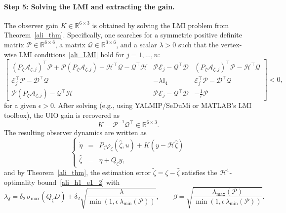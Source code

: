 \paragraph{Step 5: Solving the LMI and extracting the gain.}
The observer gain $K\in\mathbb{R}^{6\times 3}$ is obtained by solving the LMI problem from Theorem~\ref{ali_thm}. Specifically, one searches for a symmetric positive definite matrix $\mathcal{P}\in\mathbb{R}^{6\times 6}$, a matrix $\mathcal{Q}\in\mathbb{R}^{3\times 6}$, and a scalar $\lambda>0$ such that the vertex-wise LMI conditions~\eqref{ali_LMI} hold for $j=1,\dots,\bar{n}$:
\begin{equation}\label{eq:vehicle_LMI_recap}
\begin{bmatrix}
\left( P_{\zeta} \mathcal{A}_{\zeta,j}\right)^{\top} \mathcal{P} + \mathcal{P} \left( P_{\zeta} \mathcal{A}_{\zeta,j} \right)  - \mathcal{H}^{\top} \mathcal{Q}  - \mathcal{Q}^{\top}  \mathcal{H}
&
\mathcal{P} \mathcal{E}_{j} - \mathcal{Q}^{\top}  \mathcal{D}  & \left( P_{\zeta} \mathcal{A}_{\zeta,j}\right)^{\top} \mathcal{P} - \mathcal{H}^{\top} \mathcal{Q}
\\[6pt]
\mathcal{E}^{\top}_{j} \mathcal{P} - \mathcal{D}^{\top} \mathcal{Q} & 
- \lambda \mathbb{I}_{4} & \mathcal{E}^{\top}_{j} \mathcal{P} - \mathcal{D}^{\top} \mathcal{Q}
\\[6pt]
\mathcal{P} \left( P_{\zeta} \mathcal{A}_{\zeta,j} \right) - \mathcal{Q}^{\top}  \mathcal{H} & 
\mathcal{P} \mathcal{E}_{j} - \mathcal{Q}^{\top}  \mathcal{D} & - \displaystyle\frac{1}{\epsilon} \mathcal{P}
\end{bmatrix} 
< 0,
\end{equation}
for a given $\epsilon>0$. After solving (e.g., using YALMIP/SeDuMi or MATLAB's LMI toolbox), the UIO gain is recovered as
\begin{equation}\label{eq:vehicle_gain_K}
K = \mathcal{P}^{-1}\mathcal{Q}^{\top} \in \mathbb{R}^{6\times 3}.
\end{equation}
The resulting observer dynamics are written as
\begin{equation}\label{eq:vehicle_UIO_dynamics}
\left\{
\begin{array}{rcl}
\dot{\eta} & = & P_{\zeta}\varphi_{\zeta}(\hat{\zeta},u)+K\left(y-\mathcal{H}\hat{\zeta}\right) \\[4pt]
\hat{\zeta} & = & \eta+Q_{\zeta}y,
\end{array}
\right.
\end{equation}
and by Theorem~\ref{ali_thm}, the estimation error $\tilde{\zeta}=\zeta-\hat{\zeta}$ satisfies the $\mathcal{H}^1$-optimality bound~\eqref{ali_h1_e1_2} with
\begin{equation}\label{eq:vehicle_H1_bound_params}
\lambda_\delta = \delta_2\,\sigma_{\max}(Q_\zeta D) + \delta_2\sqrt{\frac{\lambda}{\min(1,\epsilon\,\lambda_{\min}(\mathcal{P}))}}, \qquad
\beta = \sqrt{\frac{\lambda_{\max}(\mathcal{P})}{\min(1,\epsilon\,\lambda_{\min}(\mathcal{P}))}}.
\end{equation}

